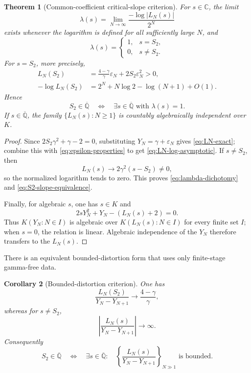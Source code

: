 \documentclass[11pt]{article}
\theoremstyle{keio}
\newtheorem{theorem}{Theorem}[section]
\newtheorem{corollary}[theorem]{Corollary}
\theoremstyle{definition}
\theoremstyle{remark}
\newcommand{\Qbar}{\overline{\mathbb Q}}
\newcommand{\C}{\mathbb C}
\begin{document}
\begin{theorem}[Common-coefficient critical-slope criterion]
\label{thm:critical-slope}
For \(s\in\C\), the limit
\[
 \lambda(s)=\lim_{N\to\infty}
 \frac{-\log|L_N(s)|}{2^N}
\]
exists whenever the logarithm is defined for all sufficiently large \(N\),
and
\begin{equation}\label{eq:lambda-dichotomy}
 \lambda(s)=
 \begin{cases}
 1,&s=S_2,\\
 0,&s\ne S_2.
 \end{cases}
\end{equation}
For \(s=S_2\), more precisely,
\begin{align}
 L_N(S_2)
 &=\frac{4-\gamma}{\gamma}\varepsilon_N
 +2S_2\varepsilon_N^2>0,\label{eq:LN-exact}\\
 -\log L_N(S_2)
 &=2^N+N\log2-\log(N+1)+O(1).
 \label{eq:LN-log-asymptotic}
\end{align}
Hence
\begin{equation}\label{eq:S2-slope-equivalence}
 \boxed{\displaystyle
 S_2\in\Qbar
 \quad\Longleftrightarrow\quad
 \exists s\in\Qbar\text{ with }\lambda(s)=1.}
\end{equation}
If \(s\in\Qbar\), the family \(\{L_N(s):N\ge1\}\) is countably
algebraically independent over \(K\).
\end{theorem}

\begin{proof}
Since \(2S_2\gamma^2+\gamma-2=0\), substituting
\(Y_N=\gamma+\varepsilon_N\) gives \eqref{eq:LN-exact}; combine this with
\eqref{eq:epsilon-properties} to get \eqref{eq:LN-log-asymptotic}.  If
\(s\ne S_2\), then
\[
 L_N(s)\longrightarrow2\gamma^2(s-S_2)\ne0,
\]
so the normalized logarithm tends to zero.  This proves
\eqref{eq:lambda-dichotomy} and \eqref{eq:S2-slope-equivalence}.

Finally, for algebraic \(s\), one has \(s\in K\) and
\[
 2sY_N^2+Y_N-(L_N(s)+2)=0.
\]
Thus \(K(Y_N:N\in I)\) is algebraic over
\(K(L_N(s):N\in I)\) for every finite set \(I\); when \(s=0\), the relation
is linear.  Algebraic independence of the \(Y_N\) therefore transfers to the
\(L_N(s)\).
\end{proof}

There is an equivalent bounded-distortion form that uses only finite-stage
gamma-free data.

\begin{corollary}[Bounded-distortion criterion]
\label{cor:bounded-distortion}
One has
\begin{equation}\label{eq:bounded-distortion-limit}
 \frac{L_N(S_2)}{Y_N-Y_{N+1}}
 \longrightarrow\frac{4-\gamma}{\gamma},
\end{equation}
whereas for \(s\ne S_2\),
\[
 \left|\frac{L_N(s)}{Y_N-Y_{N+1}}\right|\longrightarrow\infty.
\]
Consequently
\begin{equation}\label{eq:bounded-equivalence}
 S_2\in\Qbar
 \quad\Longleftrightarrow\quad
 \exists s\in\Qbar:\quad
 \left\{\frac{L_N(s)}{Y_N-Y_{N+1}}\right\}_{N\gg1}
 \text{ is bounded}.
\end{equation}
\end{corollary}
\end{document}
